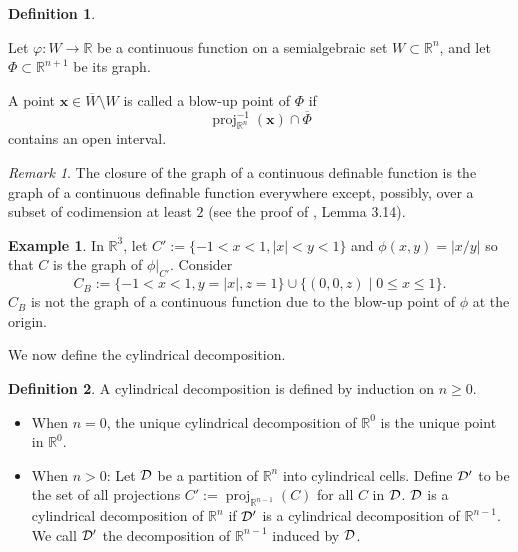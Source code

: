 \documentclass[
]{book}
\theoremstyle{definition}
\newtheorem{definition}{Definition}[chapter]
\theoremstyle{definition}
\newtheorem{example}{Example}[chapter]
\theoremstyle{definition}
\theoremstyle{definition}
\theoremstyle{remark}
\newtheorem*{remark}{Remark}
\begin{document}
\begin{definition}
\protect\hypertarget{def:blow-up-point}{}\label{def:blow-up-point}\citep[Definition 9.2]{bgv15}

Let \(\varphi : W \to \mathbb{R}\) be a continuous function on a semialgebraic set \(W \subset \mathbb{R}^n\), and let \(\Phi \subset \mathbb{R}^{n+1}\) be its graph.

A point \(\mathbf{x} \in \overline{W} \setminus W\) is called a blow-up point of \(\Phi\) if \[\operatorname{proj}^{-1}_{\mathbb{R}^n} (\mathbf{x}) \cap \overline{\Phi}\] contains an open interval.
\end{definition}

\begin{remark}
The closure of the graph of a continuous definable function is the graph of a continuous definable function everywhere
except, possibly, over a subset of codimension at least \(2\) (see the proof of \citet{bgv15}, Lemma 3.14).
\end{remark}

\begin{example}
\protect\hypertarget{exm:top-bottom-not-cylindrical}{}\label{exm:top-bottom-not-cylindrical}In \(\mathbb{R}^3\), let \(C' := \{ -1 < x < 1, \vert x \vert < y < 1 \}\) and \(\phi(x,y) = \vert x / y \vert\) so that \(C\) is the graph of \(\phi\vert_{C'}\).
Consider \[
C_B := \{ -1 < x < 1, y = \vert x \vert, z = 1 \} \cup \{ (0,0,z) \mid 0 \le x \le 1 \}.
\]
\(C_B\) is not the graph of a continuous function due to the blow-up point of \(\phi\) at the origin.
\end{example}

We now define the cylindrical decomposition.

\begin{definition}

A cylindrical decomposition is defined by induction on \(n \ge 0\).

\begin{itemize}
\item
  When \(n = 0\), the unique cylindrical decomposition of \(\mathbb{R}^0\) is the unique point in \(\mathbb{R}^0\).
\item
  When \(n > 0\): Let \(\cal D\) be a partition of \(\mathbb{R}^n\) into cylindrical cells.
  Define \(\cal D'\) to be the set of all projections \(C' := {\operatorname{proj}_{\mathbb{R}^{n-1}}}(C)\) for all \(C\) in \(\cal D\).
  \(\cal D\) is a cylindrical decomposition of \(\mathbb{R}^n\) if \(\cal D'\) is a cylindrical decomposition of \(\mathbb{R}^{n-1}\). We call \(\cal D'\) the decomposition of \(\mathbb{R}^{n-1}\) induced by \(\cal D\).
\end{itemize}

\end{definition}
\end{document}
